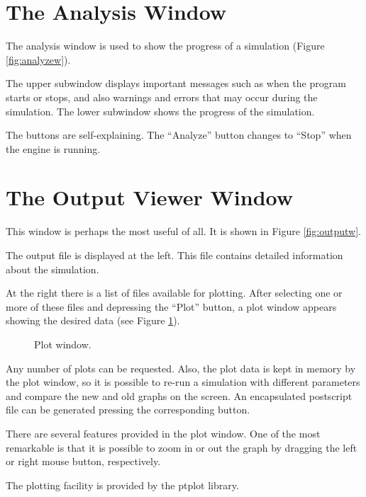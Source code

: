 \section{The Analysis Window}

The analysis window is used to show the progress of a simulation
(Figure \ref{fig:analyzew}).
%
\begin{figure*}
\centerline{\epsfxsize=10cm }
\caption{Analysis window.} \label{fig:analyzew}
\end{figure*}
%
The upper subwindow displays important messages such as when the
program starts or stops, and also warnings and errors that may occur
during the simulation. The lower subwindow shows the progress of the
simulation.

The buttons are self-explaining. The ``Analyze'' button changes to
``Stop'' when the engine is running.

\section{The Output Viewer Window}

This window is perhaps the most useful of all. It is shown in Figure
\ref{fig:outputw}.
%
\begin{figure*}
\centerline{\epsfxsize=10cm }
\caption{Output Viewer window.} \label{fig:outputw}
\end{figure*}
%
The output file is displayed at the left. This file contains detailed
information about the simulation.

At the right there is a list of files available for
plotting. After selecting one or more of these files and depressing
the ``Plot'' button, a plot window appears showing the desired data
(see Figure \ref{fig:plotw}).
%
\begin{figure}
\centerline{\epsfxsize=10cm }
\caption{Plot window.} \label{fig:plotw}
\end{figure}
%
Any number of plots can be requested. Also, the plot data is kept in
memory by the plot window, so it is possible to re-run a simulation
with different parameters and compare the new and old graphs on the
screen.  An encapsulated postscript file can be generated pressing the
corresponding button.

There are several features provided in the plot window. One of the
most remarkable is that it is possible to zoom in or out the graph by
dragging the left or right mouse button, respectively.

The plotting facility is provided by the ptplot \cite{ptplot} library.
